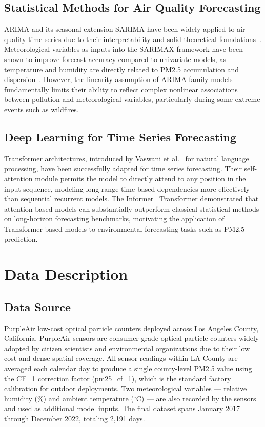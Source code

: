 \documentclass[conference]{IEEEtran}
\begin{document}
\subsection{Statistical Methods for Air Quality Forecasting}
ARIMA and its seasonal extension SARIMA have been widely applied to air quality time series due to their interpretability and solid theoretical foundations~\cite {box2015}. Meteorological variables as inputs into the SARIMAX framework have been shown to improve forecast accuracy compared to univariate models, as temperature and humidity are directly related to PM2.5 accumulation and dispersion~\cite{knaak2025}. However, the linearity assumption of ARIMA-family models fundamentally limits their ability to reflect complex nonlinear associations between pollution and meteorological variables, particularly during some extreme events such as wildfires.

\subsection{Deep Learning for Time Series Forecasting}
Transformer architectures, introduced by Vaswani et al.~\cite{vaswani2017} for natural language processing, have been successfully adapted for time series forecasting. Their self-attention module permits the model to directly attend to any position in the input sequence, modeling long-range time-based dependencies more effectively than sequential recurrent models. The Informer~\cite{zhou2021} Transformer demonstrated that attention-based models can substantially outperform classical statistical methods on long-horizon forecasting benchmarks, motivating the application of Transformer-based models to environmental forecasting tasks such as PM2.5 prediction.
\section{Data Description}

\subsection{Data Source}
PurpleAir low-cost optical particle counters deployed across Los Angeles County, California. PurpleAir sensors are consumer-grade optical particle counters widely adopted by citizen scientists and environmental organizations due to their low cost and dense spatial coverage. All sensor readings within LA County are averaged each calendar day to produce a single county-level PM2.5 value using the CF=1 correction factor (pm25\_cf\_1), which is the standard factory calibration for outdoor deployments. Two meteorological variables --- relative humidity (\%) and ambient temperature ($^\circ$C) --- are also recorded by the sensors and used as additional model inputs. The final dataset spans January 2017 through December 2022, totaling 2,191 days.
\end{document}
